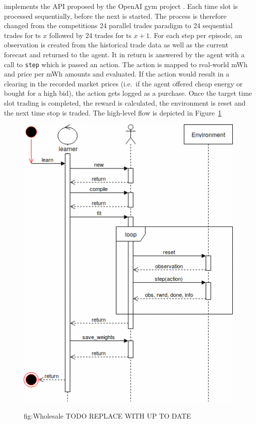 


implements the \ac{API} proposed by the OpenAI gym project \cite[]{brockman2016openai}.  Each time slot is
processed sequentially, before the next is started. The process is therefore changed from the competitions 24 parallel
trades paradigm to 24 sequential trades for ts $x$ followed by 24 trades for ts $x+1$. For each step per episode, an
observation is created from the historical trade data as well as the current forecast and returned to the agent. It
in return is answered by the agent with a call to \texttt{step} which is passed an action. The action is mapped to
real-world \ac{mWh} and price per \ac{mWh} amounts and evaluated. If the action would result in a clearing in the
recorded market prices (i.e.\ if the agent offered cheap energy or bought for a high bid), the action gets logged as a
purchase. Once the target time slot trading is completed, the reward is calculated, the environment is reset and the
next time stop is traded. The high-level flow is depicted in Figure~\ref{fig:imgWholesaleEnvironment}

\begin{figure}[]
    \centering
    \includegraphics[width=0.6\linewidth]{img/WholesaleEnvironment.png}
    \label{fig:imgWholesaleEnvironment}
    \caption{fig:Wholesale TODO REPLACE WITH UP TO DATE}
\end{figure}



